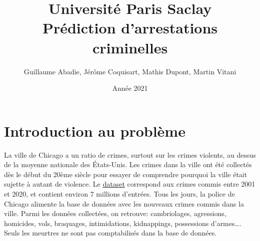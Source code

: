 \documentclass{article}
\title{\textbf{\Huge  Université Paris Saclay}\\ Prédiction d'arrestations criminelles}
\author{Guillaume Abadie, Jérôme Coquisart, Mathis Dupont, Martin Vitani}
\date{Année 2021}
\begin{document}
    \maketitle
    \tableofcontents

    \section{Introduction au problème}
    La ville de Chicago a un ratio de crimes, surtout sur les crimes violents,
    au dessus de la moyenne nationale des États-Unis.
    Les crimes dans la ville ont été collectés dès le début du 20ème siècle pour
    essayer de comprendre pourquoi la ville était sujette à autant de violence.
    Le \href{https://www.kaggle.com/n3v375/chicago-crime-from-01jan2001-to-22jul2020}{dataset} correspond aux crimes commis entre 2001 et 2020, et contient environ 
    7 millions d'entrées.
    Tous les jours, la police de Chicago alimente la base de données avec les
    nouveaux crimes commis dans la ville. 
    Parmi les données collectées, on retrouve: 
    cambriolages, agressions, homicides, vols, braquages, intimidations, kidnappings, 
    possessions d'armes\dots.
    Seuls les meurtres ne sont pas comptabilisés dans la base de données.
\end{document}
